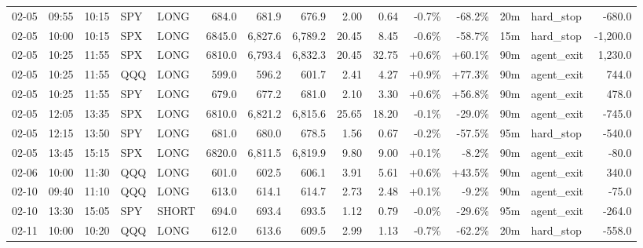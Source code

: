 \documentclass[11pt,a4paper,twoside]{article}
\begin{document}
\begin{landscape}
\begin{center}
\begin{longtable}{>{\color{txtmain}}l l l l l r r r r r r r r >{\color{txtmain}}l r}
02-05 & 09:55 & 10:15 & SPY & LONG & 684.0 & 681.9 & 676.9 & 2.00 & 0.64 & \textcolor{lossred}{-0.7\%} & \textcolor{lossred}{-68.2\%} & 20m & hard\_stop & \textcolor{lossred}{-680.0} \\
02-05 & 10:00 & 10:15 & SPX & LONG & 6845.0 & 6,827.6 & 6,789.2 & 20.45 & 8.45 & \textcolor{lossred}{-0.6\%} & \textcolor{lossred}{-58.7\%} & 15m & hard\_stop & \textcolor{lossred}{-1,200.0} \\
02-05 & 10:25 & 11:55 & SPX & LONG & 6810.0 & 6,793.4 & 6,832.3 & 20.45 & 32.75 & \textcolor{wingreen}{+0.6\%} & \textcolor{wingreen}{+60.1\%} & 90m & agent\_exit & \textcolor{wingreen}{1,230.0} \\
02-05 & 10:25 & 11:55 & QQQ & LONG & 599.0 & 596.2 & 601.7 & 2.41 & 4.27 & \textcolor{wingreen}{+0.9\%} & \textcolor{wingreen}{+77.3\%} & 90m & agent\_exit & \textcolor{wingreen}{744.0} \\
02-05 & 10:25 & 11:55 & SPY & LONG & 679.0 & 677.2 & 681.0 & 2.10 & 3.30 & \textcolor{wingreen}{+0.6\%} & \textcolor{wingreen}{+56.8\%} & 90m & agent\_exit & \textcolor{wingreen}{478.0} \\
02-05 & 12:05 & 13:35 & SPX & LONG & 6810.0 & 6,821.2 & 6,815.6 & 25.65 & 18.20 & \textcolor{lossred}{-0.1\%} & \textcolor{lossred}{-29.0\%} & 90m & agent\_exit & \textcolor{lossred}{-745.0} \\
02-05 & 12:15 & 13:50 & SPY & LONG & 681.0 & 680.0 & 678.5 & 1.56 & 0.67 & \textcolor{lossred}{-0.2\%} & \textcolor{lossred}{-57.5\%} & 95m & hard\_stop & \textcolor{lossred}{-540.0} \\
02-05 & 13:45 & 15:15 & SPX & LONG & 6820.0 & 6,811.5 & 6,819.9 & 9.80 & 9.00 & \textcolor{wingreen}{+0.1\%} & \textcolor{lossred}{-8.2\%} & 90m & agent\_exit & \textcolor{lossred}{-80.0} \\
02-06 & 10:00 & 11:30 & QQQ & LONG & 601.0 & 602.5 & 606.1 & 3.91 & 5.61 & \textcolor{wingreen}{+0.6\%} & \textcolor{wingreen}{+43.5\%} & 90m & agent\_exit & \textcolor{wingreen}{340.0} \\
02-10 & 09:40 & 11:10 & QQQ & LONG & 613.0 & 614.1 & 614.7 & 2.73 & 2.48 & \textcolor{wingreen}{+0.1\%} & \textcolor{lossred}{-9.2\%} & 90m & agent\_exit & \textcolor{lossred}{-75.0} \\
02-10 & 13:30 & 15:05 & SPY & SHORT & 694.0 & 693.4 & 693.5 & 1.12 & 0.79 & \textcolor{lossred}{-0.0\%} & \textcolor{lossred}{-29.6\%} & 95m & agent\_exit & \textcolor{lossred}{-264.0} \\
02-11 & 10:00 & 10:20 & QQQ & LONG & 612.0 & 613.6 & 609.5 & 2.99 & 1.13 & \textcolor{lossred}{-0.7\%} & \textcolor{lossred}{-62.2\%} & 20m & hard\_stop & \textcolor{lossred}{-558.0} \\

\end{longtable}
\end{center}
\end{landscape}
\end{document}
